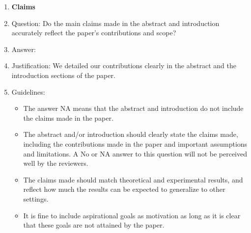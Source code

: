 \documentclass{article}
\begin{document}
\begin{enumerate}

\item {\bf Claims}
    \item[] Question: Do the main claims made in the abstract and introduction accurately reflect the paper's contributions and scope?
    \item[] Answer: \answerYes{} %
    \item[] Justification: 
    We detailed our contributions clearly in the abstract and the introduction sections of the paper.
    \item[] Guidelines:
    \begin{itemize}
        \item The answer NA means that the abstract and introduction do not include the claims made in the paper.
        \item The abstract and/or introduction should clearly state the claims made, including the contributions made in the paper and important assumptions and limitations. A No or NA answer to this question will not be perceived well by the reviewers. 
        \item The claims made should match theoretical and experimental results, and reflect how much the results can be expected to generalize to other settings. 
        \item It is fine to include aspirational goals as motivation as long as it is clear that these goals are not attained by the paper. 
    \end{itemize}


\end{enumerate}
\end{document}
